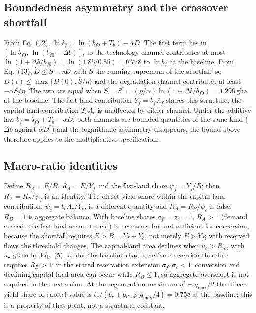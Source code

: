 \documentclass[11pt,a4paper]{article}
\newcommand{\Ups}{\Upsilon_c}
\begin{document}
\subsection{Boundedness asymmetry and the crossover shortfall}\label{si:bounded}

From Eq.~(12), $\ln b_f=\ln(b_{f0}+T_b)-\alpha D$. The first term lies in $[\ln b_{f0},\ \ln(b_{f0}+\Delta b)]$, so the technology channel contributes at most $\ln(1+\Delta b/b_{f0})=\ln(1.85/0.85)=0.778$ to $\ln b_f$ at the baseline. From Eq.~(13), $\dot D\le\bar S-\eta D$ with $\bar S$ the running supremum of the shortfall, so $D(t)\le\max\{D(0),\bar S/\eta\}$ and the degradation channel contributes at least $-\alpha\bar S/\eta$. The two are equal when $\bar S=S^\dagger=(\eta/\alpha)\ln(1+\Delta b/b_{f0})=1.296\,\mathrm{gha}$ at the baseline. The fast-land contribution $Y_f=b_fA_f$ shares this structure; the capital-land contribution $\Ups A_c$ is unaffected by either channel. Under the additive law $b_f=b_{f0}+T_b-\alpha D$, both channels are bounded quantities of the same kind ($\Delta b$ against $\alpha D^*$) and the logarithmic asymmetry disappears, the bound above therefore applies to the multiplicative specification.

\subsection{Macro-ratio identities}\label{si:ratios}

Define $R_B=E/B$, $R_A=E/Y_f$ and the fast-land share $\psi_f=Y_f/B$; then $R_A=R_B/\psi_f$ is an identity. The direct-yield share within the capital-land contribution, $\psi_c=b_cA_c/Y_c$, is a different quantity and $R_A=R_B/\psi_c$ is false. $R_B=1$ is aggregate balance. With baseline shares $\sigma_f=\sigma_c=1$, $R_A>1$ (demand exceeds the fast-land account yield) is necessary but not sufficient for conversion, because the shortfall requires $E>B=Y_f+Y_c$, not merely $E>Y_f$; with reserved flows the threshold changes. The capital-land area declines when $u_c>R_{rc}$, with $u_c$ given by Eq.~(5). Under the baseline shares, active conversion therefore requires $R_B>1$; in the stated reservation extension $\sigma_f,\sigma_c<1$, conversion and declining capital-land area can occur while $R_B\le1$, so aggregate overshoot is not required in that extension. At the regeneration maximum $q^*=q_{\max}/2$ the direct-yield share of capital value is $b_c/(b_c+b_{G,c}\rho_cq_{\max}/4)=0.758$ at the baseline; this is a property of that point, not a structural constant.
\end{document}
